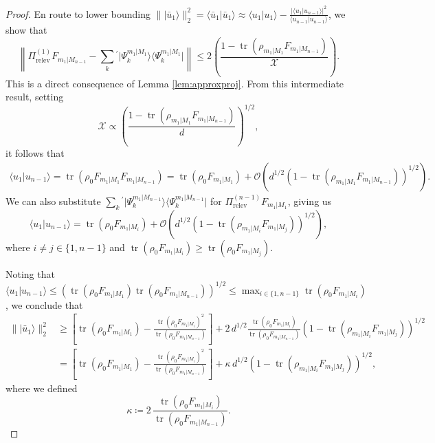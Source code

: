 \begin{proof}
En route to lower bounding $\| \vert \bar{u}_1 \rangle \|_2^{2} = \langle \bar{u}_1\vert \bar{u}_1 \rangle \approx \langle u_1 \vert u_1 \rangle - \frac{\vert \langle u_1 \vert u_{n-1}\rangle \vert ^2}{\langle u_{n-1} \vert u_{n-1}\rangle}$, we show that \[\left\|\Pi_{\text{relev}}^{(1)}F_{m_1\vert M_{n-1}}-\sum_k{}^{'}\vert \Psi_k^{m_1\vert M_1} \rangle \langle \Psi_k^{m_1\vert M_1} \vert \right\| \leq 2\left( \frac{1-  \operatorname{tr}(\rho_{m_1\vert M_1}F_{m_1\vert M_{n-1}}) }{\mathcal{X}} \right).\] This is a direct consequence of Lemma \ref{lem:approxproj}.
From this intermediate result, setting \[\mathcal{X}\propto\left(\frac{1-\operatorname{tr}(\rho_{m_1\vert M_1}F_{m_1\vert M_{n-1}})}{d}\right)^{1/2},\] it follows that 
\begin{equation}
\begin{split}
\langle u_1 \vert u_{n-1}\rangle =  \operatorname{tr}(\rho_0 F_{m_1 \vert M_1} F_{m_1 \vert M_{n-1}}) = \operatorname{tr}(\rho_0F_{m_1\vert M_1}) +\mathcal{O}\left(d^{1/2} \left(1-\operatorname{tr}(\rho_{m_1\vert M_1}F_{m_1\vert M_{n-1}})\right)^{1/2} \right).
\end{split}
\end{equation}
We can also substitute $\sum_k{}^{'}\vert \Psi_k ^{m_1\vert M_{n-1}}\rangle \langle \Psi_k ^{m_1\vert M_{n-1}} \vert$ for $\Pi_{\text{relev}}^{(n-1)}F_{m_1\vert M_1}$, giving us
\[\langle u_1 \vert u_{n-1}\rangle = \operatorname{tr}(\rho_0 F_{m_1\vert M_i}) +  \mathcal{O}\left(d^{1/2} \left(1-\operatorname{tr}(\rho_{m_1\vert M_i}F_{m_1\vert M_j})\right)^{1/2} \right),\]
where $i\neq j \in \{1,n-1\}$ and $\operatorname{tr}(\rho_0 F_{m_1\vert M_i})\geq \operatorname{tr}(\rho_0 F_{m_1\vert M_j})$.

Noting that $\langle u_1 \vert u_{n-1} \rangle \leq \left(\operatorname{tr}(\rho_0F_{m_1\vert M_1})\operatorname{tr}(\rho_0F_{m_1\vert M_{n-1}})\right)^{1/2}\leq \max_{i\in \{1,n-1\}} \operatorname{tr}(\rho_0 F_{m_1\vert M_i})$, we conclude that 
\[\begin{split} \|\vert \bar{u}_1 \rangle \|_2^2  & \geq \left[\operatorname{tr}(\rho_0 F_{m_1\vert M_1})-\frac{\operatorname{tr}(\rho_0 F_{m_1\vert M_i})^2}{\operatorname{tr}(\rho_0 F_{m_1\vert M_{n-1}})}\right]+ 2\,d^{1/2}\frac{\operatorname{tr}(\rho_0 F_{m_1\vert M_i})}{\operatorname{tr}(\rho_0 F_{m_1\vert M_{n-1}})}\left(1-\operatorname{tr}(\rho_{m_1\vert M_i} F_{m_1\vert M_j})\right)^{1/2} \\[1em]
& = \left[\operatorname{tr}(\rho_0 F_{m_1\vert M_1})-\frac{\operatorname{tr}(\rho_0 F_{m_1\vert M_i})^2}{\operatorname{tr}(\rho_0 F_{m_1\vert M_{n-1}})}\right]+\kappa\, d^{1/2}\left(1-\operatorname{tr}(\rho_{m_1\vert M_i} F_{m_1\vert M_j})\right)^{1/2}, \end{split}\]
where we defined \[\kappa\coloneqq 2\,\frac{\operatorname{tr}(\rho_0 F_{m_1\vert M_i})}{\operatorname{tr}(\rho_0 F_{m_1\vert M_{n-1}})}.\]


\end{proof}

